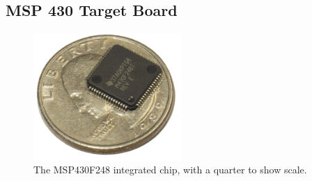 \subsection{MSP 430 Target Board}
\label{MSP430Target}

\begin{figure}
\begin{center}
\includegraphics[width=0.5\textwidth]{images/QFPFoot.jpg}
\caption{The MSP430F248 integrated chip, with a quarter to show scale.}
\label{Fig:QFPFoot}
\end{center}
\end{figure}

